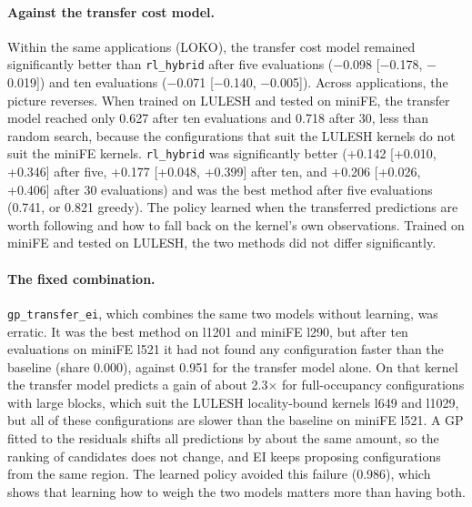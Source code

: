 \documentclass[10pt]{article}
\newcommand{\x}{\ensuremath{\times}}
\newcommand{\code}[1]{\texttt{#1}}
\begin{document}
\paragraph{Against the transfer cost model.} Within the same applications
(LOKO), the transfer cost model remained significantly better than
\code{rl\_hybrid} after five evaluations ($-$0.098 [$-$0.178, $-$0.019]) and
ten evaluations ($-$0.071 [$-$0.140, $-$0.005]). Across applications, the
picture reverses. When trained on LULESH and tested on miniFE, the transfer
model reached only 0.627 after ten evaluations and 0.718 after 30, less than
random search, because the configurations that suit the LULESH kernels do not
suit the miniFE kernels. \code{rl\_hybrid} was significantly better (+0.142
[+0.010, +0.346] after five, +0.177 [+0.048, +0.399] after ten, and +0.206
[+0.026, +0.406] after 30 evaluations) and was the best method after five
evaluations (0.741, or 0.821 greedy). The policy learned when the transferred
predictions are worth following and how to fall back on the kernel's own
observations. Trained on miniFE and tested on LULESH, the two methods did not
differ significantly.

\paragraph{The fixed combination.} \code{gp\_transfer\_ei}, which combines
the same two models without learning, was erratic. It was the best method on
l1201 and miniFE l290, but after ten evaluations on miniFE l521 it had not
found any configuration faster than the baseline (share 0.000), against 0.951
for the transfer model alone. On that kernel the transfer model predicts a
gain of about 2.3\x{} for full-occupancy configurations with large blocks,
which suit the LULESH locality-bound kernels l649 and l1029, but all of these
configurations are slower than the baseline on miniFE l521. A GP fitted to
the residuals shifts all predictions by about the same amount, so the ranking
of candidates does not change, and EI keeps proposing configurations from the
same region. The learned policy avoided this failure (0.986), which shows
that learning how to weigh the two models matters more than having both.
\end{document}
